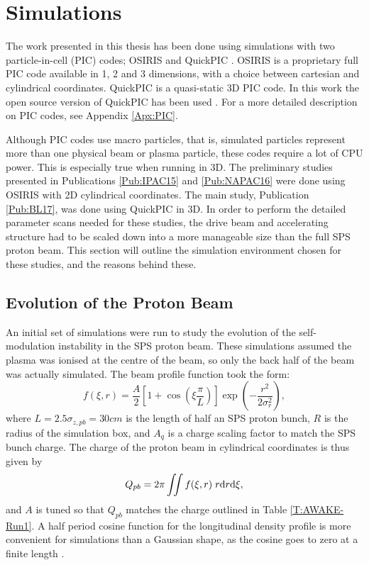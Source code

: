 %
%

\chapter{Simulations}
\label{Ch:Sim}

The work presented in this thesis has been done using simulations with two particle-in-cell (PIC) codes; OSIRIS \cite{fonseca:2002} and QuickPIC \cite{an:2013, huang:2006}. OSIRIS is a proprietary full PIC code available in 1, 2 and 3 dimensions, with a choice between cartesian and cylindrical coordinates. QuickPIC is a quasi-static 3D PIC code. In this work the open source version of QuickPIC has been used \cite{add:quickpic:web}. For a more detailed description on PIC codes, see Appendix \ref{Apx:PIC}.

Although PIC codes use macro particles, that is, simulated particles represent more than one physical beam or plasma particle, these codes require a lot of CPU power. This is especially true when running in 3D. The preliminary studies presented in Publications \ref{Pub:IPAC15} and \ref{Pub:NAPAC16} were done using OSIRIS with 2D cylindrical coordinates. The main study, Publication \ref{Pub:BL17}, was done using QuickPIC in 3D. In order to perform the detailed parameter scans needed for these studies, the drive beam and accelerating structure had to be scaled down into a more manageable size than the full SPS proton beam. This section will outline the simulation environment chosen for these studies, and the reasons behind these.

\section{Evolution of the Proton Beam}
\label{Sim:PBeam}

An initial set of simulations were run to study the evolution of the self-modulation instability in the SPS proton beam. These simulations assumed the plasma was ionised at the centre of the beam, so only the back half of the beam was actually simulated. The beam profile function took the form:
\begin{equation}
    f(\xi,r) = \frac{A}{2} \left[1 + \cos\left(\xi\frac{\pi}{L}\right)\right] \exp\left(-\frac{r^{2}}{2\sigma_{r}^{2}}\right), \label{EQ:SPS-Profile}
\end{equation}
where $L = 2.5\sigma_{z,pb} = 30\unit{cm}$ is the length of half an SPS proton bunch, $R$ is the radius of the simulation box, and $A_{q}$ is a charge scaling factor to match the SPS bunch charge. The charge of the proton beam in cylindrical coordinates is thus given by
\begin{equation}
    Q_{pb} = 2\pi \iint f(\xi,r) \;r \mathrm{d} r \mathrm{d} \xi, \label{EQ:SPS-Charge}
\end{equation}
and $A$ is tuned so that $Q_{pb}$ matches the charge outlined in Table \ref{T:AWAKE-Run1}. A half period cosine function for the longitudinal density profile is more convenient for simulations than a Gaussian shape, as the cosine goes to zero at a finite length \cite{lotov:2010}.

